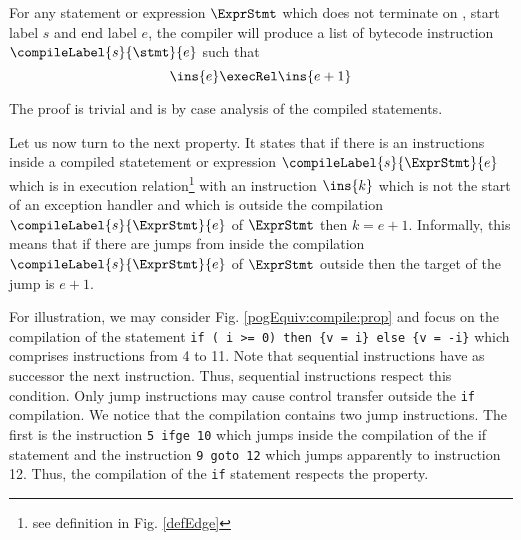 \begin{compProp0}\label{compile:prop:compProp0}
 For any statement or expression $\ExprStmt$ which does not terminate on \return, start label $s$ and end label $e$,
    the compiler will produce a list of bytecode instruction $\compileLabel{s}{\stmt}{e}$ such that 
     $$ \ins{e} \execRel \ins{e+1}$$
\end{compProp0}
The proof is trivial and is by case analysis of the compiled statements.

Let us now turn to the next property. It states  that  if there is an instructions inside a compiled statetement or expression 
 $\compileLabel{s}{\ExprStmt}{e}$ which   is in execution relation\footnote{see definition in Fig. \ref{defEdge}}  with an instruction 
$\ins{k}$ which is not the start of an exception handler and which is outside the compilation $\compileLabel{s}{\ExprStmt }{e}$
of $\ExprStmt$  then   $ k  = e +1$. Informally,  this means that if there are jumps from inside the compilation  $\compileLabel{s}{\ExprStmt}{e}$  of $\ExprStmt$   
outside then the target of the jump is $e +1$.

For illustration, we may consider Fig. \ref{pogEquiv:compile:prop} and focus on the compilation of the statement  
\lstinline!if ( i >= 0) then {v = i} else {v = -i}! 
which comprises instructions from 4 to 11. Note that sequential instructions   have as  successor the next instruction.  Thus, sequential
instructions respect this condition. 
Only jump instructions may cause control transfer outside the \lstinline!if! compilation. 
We notice that the compilation contains two jump instructions. 
The first is the instruction \lstinline!5 ifge 10! which jumps inside the compilation of the if statement
and the instruction \lstinline!9 goto 12!  which jumps apparently to instruction 12. 
Thus, the compilation of the \lstinline!if! statement respects the property.

